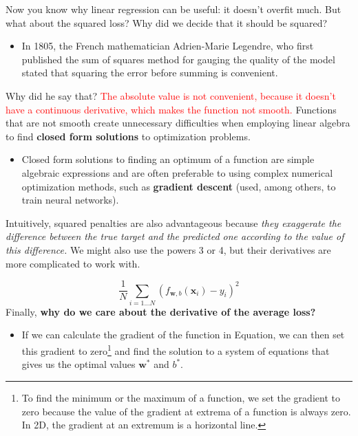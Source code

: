\documentclass[9pt,dvipsnames]{beamer}
\begin{document}
\begin{frame}
	Now you know why linear regression can be useful: it doesn't overfit much. But what about the squared loss? Why did we decide that it should be squared? 
	\begin{itemize}
		\item In 1805, the French mathematician Adrien-Marie Legendre, who first published the sum of squares method for gauging the quality of the model stated that squaring the error before summing is convenient.
	\end{itemize}
	 Why did he say that? \textcolor{red}{The absolute value is not convenient, because it doesn't have a continuous derivative, which makes the function not smooth.} Functions that are not smooth create unnecessary difficulties when employing linear algebra to find \textbf{closed form solutions} to optimization problems. 
	 \begin{itemize}
	 	\item Closed form solutions to finding an optimum of a function are simple algebraic expressions and are often preferable to using complex numerical optimization methods, such as \textbf{gradient descent} (used, among others, to train neural networks).
	 \end{itemize}
	Intuitively, squared penalties are also advantageous because \textit{they exaggerate the difference between the true target and the predicted one according to the value of this difference.} We might also use the powers 3 or 4, but their derivatives are more complicated to work with.
\end{frame}

\begin{frame}
	$$
	\frac{1}{N} \sum_{i=1 \ldots N}\left(f_{\mathbf{w}, b}\left(\mathbf{x}_{i}\right)-y_{i}\right)^{2}
	$$
	Finally, \textbf{why do we care about the derivative of the average loss?} 
	\begin{itemize}
		\item 	If we can calculate the gradient of the function in Equation, we can then set this gradient to zero\footnote{To find the minimum or the maximum of a function, we set the gradient to zero because the value of the gradient at extrema of a function is always zero. In 2D, the gradient at an extremum is a horizontal line.} and find the solution to a system of equations that gives us the optimal values $\mathbf{w}^{*}$ and $b^{*}$.
	\end{itemize}
\end{frame}
\end{document}
